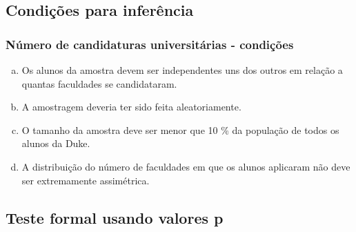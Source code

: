 
\subsection{Condições para inferência}


\begin{frame}
\frametitle{Número de candidaturas universitárias - condições}
\justifying
{}

\begin{enumerate}[(a)]
\justifying
\item Os alunos da amostra devem ser independentes uns dos outros em relação a quantas faculdades se candidataram.
\justifying
\item A amostragem deveria ter sido feita aleatoriamente.
\justifying
\item O tamanho da amostra deve ser menor que 10 \% da população de todos os alunos da Duke.
\justifying
{}
\justifying
\item A distribuição do número de faculdades em que os alunos aplicaram não deve ser extremamente assimétrica.
\end{enumerate}

\end{frame}


\subsection{Teste formal usando valores p}


